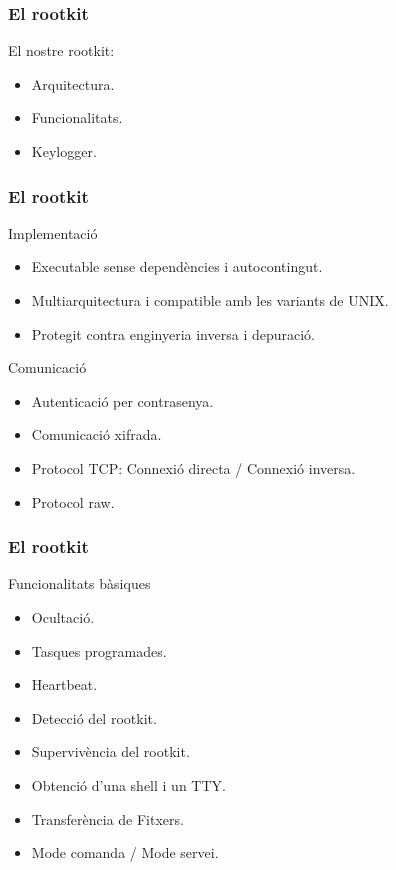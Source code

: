 \documentclass{beamer}
\begin{document}
\begin{frame}
    \frametitle{El rootkit}
	\begin{block}{El nostre rootkit:}
		\begin{itemize}
			\item Arquitectura.
			\item \alert{Funcionalitats.}
			\item Keylogger.
		\end{itemize}
	\end{block}
\end{frame}

\begin{frame}
	\frametitle{El rootkit}
	\begin{block}{Implementació}
		\begin{itemize}
			\item Executable sense dependències i autocontingut.
				\pause
			\item Multiarquitectura i compatible amb les variants de UNIX.
				\pause
			\item Protegit contra enginyeria inversa i depuració.
				\pause
		\end{itemize}
	\end{block}
	\begin{block}{Comunicació}
		\begin{itemize}
			\item Autenticació per contrasenya.
				\pause
			\item Comunicació xifrada.
				\pause
			\item Protocol TCP: Connexió directa / Connexió inversa.
				\pause
			\item Protocol raw.
		\end{itemize}
	\end{block}
\end{frame}
\begin{frame}
	\frametitle{El rootkit}
	\begin{block}{Funcionalitats bàsiques}
		\begin{itemize}
			\item Ocultació.
				\pause
			\item Tasques programades.
				\pause
			\item Heartbeat.
				\pause
			\item Detecció del rootkit.
				\pause
			\item Supervivència del rootkit.
				\pause
			\item Obtenció d'una shell i un TTY.
				\pause
			\item Transferència de Fitxers.
				\pause
			\item Mode comanda / Mode servei.
		\end{itemize}
	\end{block}
\end{frame}
\end{document}
